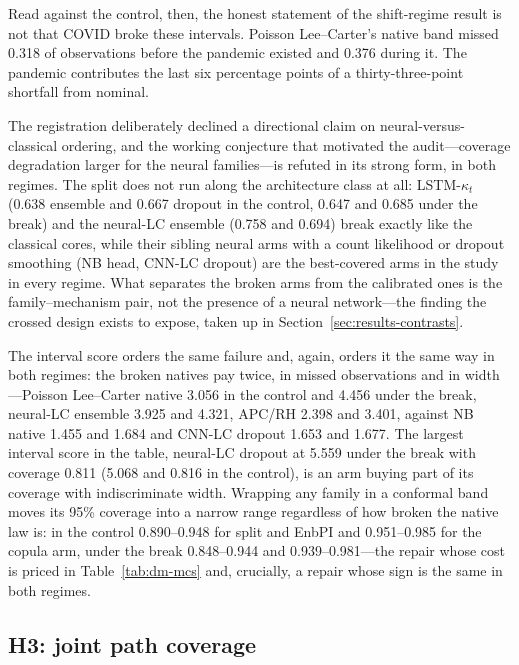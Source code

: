 Read against the control, then, the honest statement of the shift-regime
result is not that COVID broke these intervals. Poisson Lee--Carter's
native band missed 0.318 of observations before the pandemic existed and
0.376 during it. The pandemic contributes the last six percentage points
of a thirty-three-point shortfall from nominal.

The registration deliberately declined a directional claim on
neural-versus-classical ordering, and the working conjecture that
motivated the audit---coverage degradation larger for the neural
families---is refuted in its strong form, in both regimes. The split does
not run along the architecture class at all: LSTM-$\kappa_t$ (0.638
ensemble and 0.667 dropout in the control, 0.647 and 0.685 under the
break) and the neural-LC ensemble (0.758 and 0.694) break exactly like the
classical cores, while their sibling neural arms with a count likelihood
or dropout smoothing (NB head, CNN-LC dropout) are the best-covered arms
in the study in every regime. What separates the broken arms from the
calibrated ones is the family--mechanism pair, not the presence of a
neural network---the finding the crossed design exists to expose, taken up
in Section~\ref{sec:results-contrasts}.

The interval score orders the same failure and, again, orders it the same
way in both regimes: the broken natives pay twice, in missed observations
and in width---Poisson Lee--Carter native 3.056 in the control and 4.456
under the break, neural-LC ensemble 3.925 and 4.321, APC/RH 2.398 and
3.401, against NB native 1.455 and 1.684 and CNN-LC dropout 1.653 and
1.677. The largest interval score in the table, neural-LC dropout at 5.559
under the break with coverage 0.811 (5.068 and 0.816 in the control), is
an arm buying part of its coverage with indiscriminate width. Wrapping any
family in a conformal band moves its 95\% coverage into a narrow range
regardless of how broken the native law is: in the control 0.890--0.948
for split and EnbPI and 0.951--0.985 for the copula arm, under the break
0.848--0.944 and 0.939--0.981---the repair whose cost is priced in
Table~\ref{tab:dm-mcs} and, crucially, a repair whose sign is the same in
both regimes.

\subsection{H3: joint path coverage}
\label{sec:results-joint}


